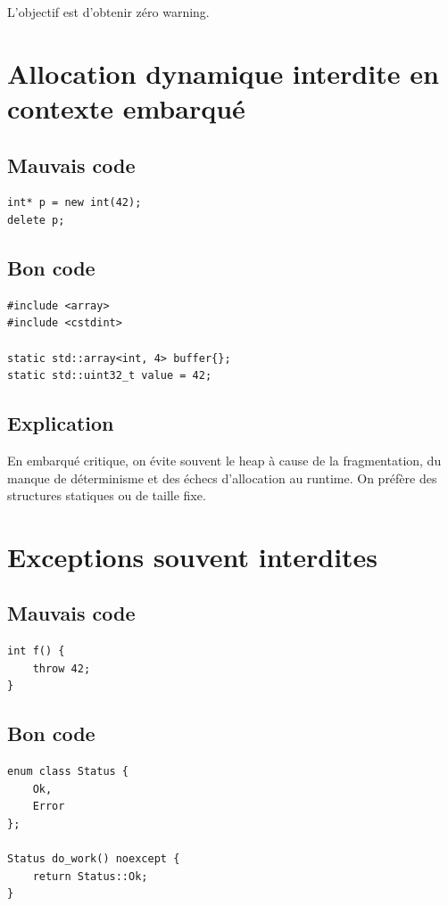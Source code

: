 \documentclass[a4paper,11pt]{report}
\begin{document}
L'objectif est d'obtenir zéro warning.

\chapter{Allocation dynamique interdite en contexte embarqué}

\section{Mauvais code}
\begin{lstlisting}
int* p = new int(42);
delete p;
\end{lstlisting}

\section{Bon code}
\begin{lstlisting}
#include <array>
#include <cstdint>

static std::array<int, 4> buffer{};
static std::uint32_t value = 42;
\end{lstlisting}

\section{Explication}
En embarqué critique, on évite souvent le heap à cause de la fragmentation, du manque de déterminisme et des échecs d'allocation au runtime.
On préfère des structures statiques ou de taille fixe.

\chapter{Exceptions souvent interdites}

\section{Mauvais code}
\begin{lstlisting}
int f() {
    throw 42;
}
\end{lstlisting}

\section{Bon code}
\begin{lstlisting}
enum class Status {
    Ok,
    Error
};

Status do_work() noexcept {
    return Status::Ok;
}
\end{lstlisting}
\end{document}
